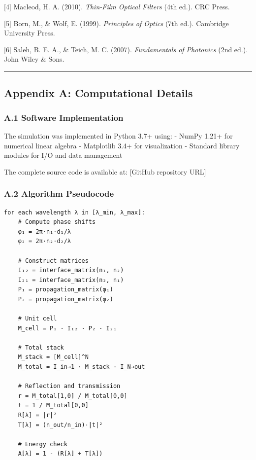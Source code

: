 \documentclass[
]{article}
\begin{document}
{[}4{]} Macleod, H. A. (2010). \emph{Thin-Film Optical Filters} (4th
ed.). CRC Press.

{[}5{]} Born, M., \& Wolf, E. (1999). \emph{Principles of Optics} (7th
ed.). Cambridge University Press.

{[}6{]} Saleh, B. E. A., \& Teich, M. C. (2007). \emph{Fundamentals of
Photonics} (2nd ed.). John Wiley \& Sons.

\begin{center}\rule{0.5\linewidth}{0.5pt}\end{center}

\subsection{Appendix A: Computational
Details}\label{appendix-a-computational-details}

\subsubsection{A.1 Software
Implementation}\label{a.1-software-implementation}

The simulation was implemented in Python 3.7+ using: - NumPy 1.21+ for
numerical linear algebra - Matplotlib 3.4+ for visualization - Standard
library modules for I/O and data management

The complete source code is available at: {[}GitHub repository URL{]}

\subsubsection{A.2 Algorithm Pseudocode}\label{a.2-algorithm-pseudocode}

\begin{verbatim}
for each wavelength λ in [λ_min, λ_max]:
    # Compute phase shifts
    φ₁ = 2π·n₁·d₁/λ
    φ₂ = 2π·n₂·d₂/λ
    
    # Construct matrices
    I₁₂ = interface_matrix(n₁, n₂)
    I₂₁ = interface_matrix(n₂, n₁)
    P₁ = propagation_matrix(φ₁)
    P₂ = propagation_matrix(φ₂)
    
    # Unit cell
    M_cell = P₁ · I₁₂ · P₂ · I₂₁
    
    # Total stack
    M_stack = [M_cell]^N
    M_total = I_in→1 · M_stack · I_N→out
    
    # Reflection and transmission
    r = M_total[1,0] / M_total[0,0]
    t = 1 / M_total[0,0]
    R[λ] = |r|²
    T[λ] = (n_out/n_in)·|t|²
    
    # Energy check
    A[λ] = 1 - (R[λ] + T[λ])
\end{verbatim}
\end{document}
